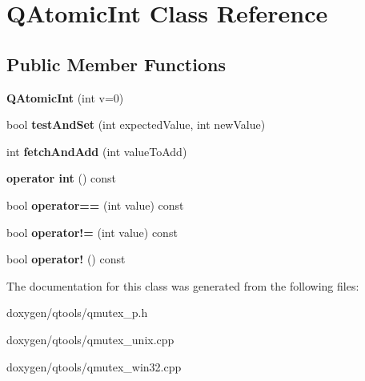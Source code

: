\hypertarget{class_q_atomic_int}{}\section{Q\+Atomic\+Int Class Reference}
\label{class_q_atomic_int}
\subsection*{Public Member Functions}
\begin{DoxyCompactItemize}
\item 
\mbox{\label{class_q_atomic_int_a037264d43e207bc7bc5972bd1fa6f1c0}} 
{\bfseries Q\+Atomic\+Int} (int v=0)
\item 
\mbox{\label{class_q_atomic_int_aeed46f5d04f464e6a9e8a7d4b7f9bb15}} 
bool {\bfseries test\+And\+Set} (int expected\+Value, int new\+Value)
\item 
\mbox{\label{class_q_atomic_int_ad227a9b305a6276545abb3f419ea0a1b}} 
int {\bfseries fetch\+And\+Add} (int value\+To\+Add)
\item 
\mbox{\label{class_q_atomic_int_a289f2cde494fb8a025647c7b2276aa0e}} 
{\bfseries operator int} () const
\item 
\mbox{\label{class_q_atomic_int_a4b2de5648ba1f46605df180947e9afc5}} 
bool {\bfseries operator==} (int value) const
\item 
\mbox{\label{class_q_atomic_int_aa2e390946d9fb40272e0084dfdc2fd44}} 
bool {\bfseries operator!=} (int value) const
\item 
\mbox{\label{class_q_atomic_int_af37da2fbf61d44d2a682f6bd89e12aa6}} 
bool {\bfseries operator!} () const
\end{DoxyCompactItemize}


The documentation for this class was generated from the following files\+:\begin{DoxyCompactItemize}
\item 
doxygen/qtools/qmutex\+\_\+p.\+h\item 
doxygen/qtools/qmutex\+\_\+unix.\+cpp\item 
doxygen/qtools/qmutex\+\_\+win32.\+cpp\end{DoxyCompactItemize}
